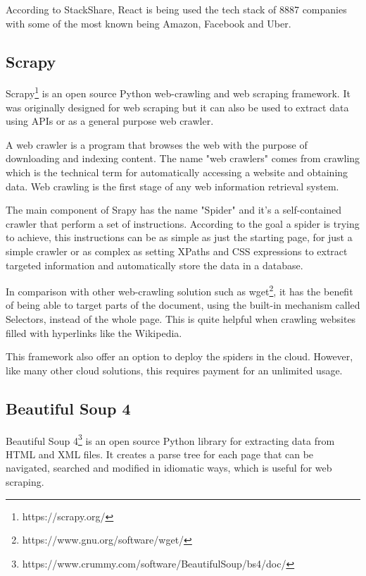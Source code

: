 According to StackShare\cite{react2020Stack}, React is being used the tech stack of 8887 companies with some of the most known being Amazon, Facebook and Uber.

\subsection{Scrapy}

Scrapy\footnote{https://scrapy.org/} is an open source Python web-crawling and web scraping framework.
It was originally designed for web scraping but it can also be used to extract data using APIs or as a general purpose web crawler.

A web crawler is a program that browses the web with the purpose of downloading and indexing content.
The name "web crawlers" comes from crawling which is the technical term for automatically accessing a website and obtaining data.
Web crawling is the first stage of any web information retrieval system\cite{age2015self}.

The main component of Srapy has the name "Spider" and it's a self-contained crawler that perform a set of instructions.
According to the goal a spider is trying to achieve, this instructions can be as simple as just the starting page, for just a simple crawler or as complex as setting XPaths and CSS expressions to extract targeted information and automatically store the data in a database.

In comparison with other web-crawling solution such as wget\footnote{https://www.gnu.org/software/wget/}, it has the benefit of being able to target parts of the document, using the built-in mechanism called Selectors, instead of the whole page.
This is quite helpful when crawling websites filled with hyperlinks like the Wikipedia.

This framework also offer an option to deploy the spiders in the cloud.
However, like many other cloud solutions, this requires payment for an unlimited usage.

\subsection{Beautiful Soup 4}

Beautiful Soup 4\footnote{https://www.crummy.com/software/BeautifulSoup/bs4/doc/} is an open source Python library for extracting data from HTML and XML files.
It creates a parse tree for each page that can be navigated, searched and modified in idiomatic ways, which is useful for web scraping.

